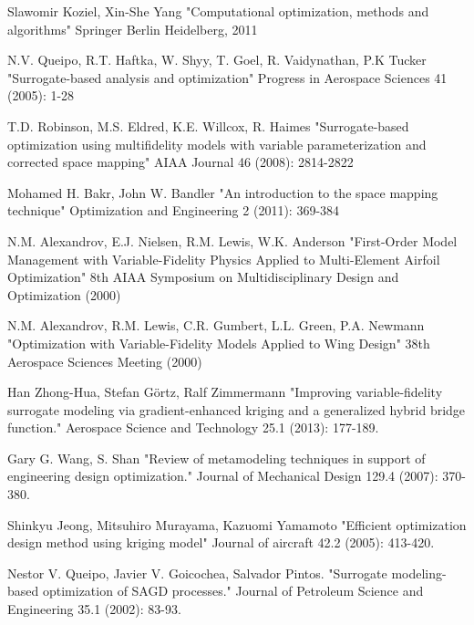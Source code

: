 \documentclass[a4paper,onecolumn]{article}
\theoremstyle{remark}
\begin{document}
\begin{thebibliography}{9}
Slawomir Koziel, Xin-She Yang
"Computational optimization, methods and algorithms"
Springer Berlin Heidelberg, 2011

N.V. Queipo, R.T. Haftka, W. Shyy, T. Goel, R. Vaidynathan, P.K Tucker
"Surrogate-based analysis and optimization"
Progress in Aerospace Sciences 41 (2005): 1-28

T.D. Robinson, M.S. Eldred, K.E. Willcox, R. Haimes
"Surrogate-based optimization using multifidelity models with variable 
parameterization and corrected space mapping"
AIAA Journal 46 (2008): 2814-2822

Mohamed H. Bakr, John W. Bandler
"An introduction to the space mapping technique"
Optimization and Engineering 2 (2011): 369-384

N.M. Alexandrov, E.J. Nielsen, R.M. Lewis, W.K. Anderson
"First-Order Model Management with Variable-Fidelity Physics 
Applied to Multi-Element Airfoil Optimization"
8th AIAA Symposium on Multidisciplinary Design and Optimization (2000)


N.M. Alexandrov, R.M. Lewis, C.R. Gumbert, L.L. Green, P.A. Newmann
"Optimization with Variable-Fidelity Models Applied to Wing Design"
38th Aerospace Sciences Meeting (2000)

Han Zhong-Hua, Stefan Görtz, Ralf Zimmermann
"Improving variable-fidelity surrogate modeling via gradient-enhanced kriging and a generalized hybrid bridge function."
Aerospace Science and Technology 25.1 (2013): 177-189.

Gary G. Wang, S. Shan
"Review of metamodeling techniques in support of engineering design optimization."
Journal of Mechanical Design 129.4 (2007): 370-380.

Shinkyu Jeong, Mitsuhiro Murayama, Kazuomi Yamamoto
"Efficient optimization design method using kriging model" 
Journal of aircraft 42.2 (2005): 413-420.

Nestor V. Queipo, Javier V. Goicochea, Salvador Pintos. 
"Surrogate modeling-based optimization of SAGD processes." 
Journal of Petroleum Science and Engineering 35.1 (2002): 83-93.


\end{thebibliography}
\end{document}
